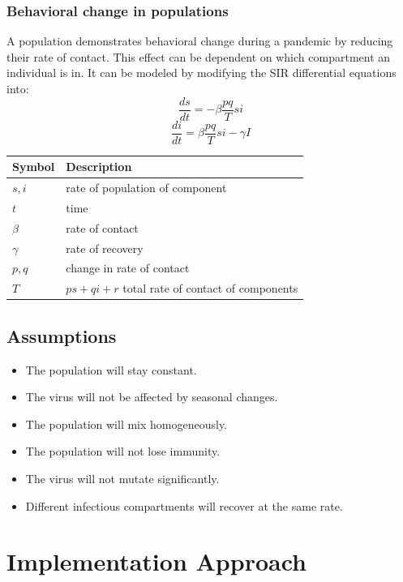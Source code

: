 \documentclass{article}
\begin{document}
\subsubsection{Behavioral change in populations}
A population demonstrates behavioral change during a pandemic by reducing their rate of contact. This effect can be dependent on which compartment an individual is in. It can be modeled by modifying the SIR differential equations into:
\[
  \frac{ds}{dt} = - \beta \frac{pq}{T}si
\]
\[
  \frac{di}{dt} = \beta \frac{pq}{T}si - \gamma I
\]

\begin{center}
  \begin{tabular}{|l|l|}
    \hline
    Symbol & Description \\ [0.5ex]
    \hline\hline
    $s, i $ & rate of population of component \\
    \hline
    $t$ & time \\
    \hline
    $\beta$ & rate of contact \\
    \hline
    $\gamma$ & rate of recovery \\
    \hline
    $p, q$ & change in rate of contact \\
    \hline
    $T$ & $ps + qi + r$ total rate of contact of components \\
    \hline
  \end{tabular}
\end{center}

\cite{behavior}
\subsection{Assumptions}
\begin{itemize}
\item The population will stay constant. 
\item The virus will not be affected by seasonal changes. 
\item The population will mix homogeneously.  
\item The population will not lose immunity. 
\item The virus will not mutate significantly.
\item Different infectious compartments will recover at the same rate.
\end{itemize}

\section{Implementation Approach}
\end{document}
